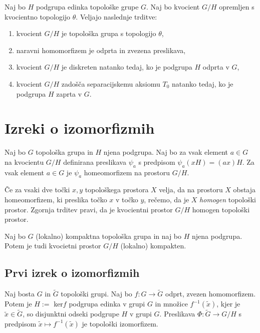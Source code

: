 \documentclass[mat1]{fmfdelo}
\begin{document}
\begin{izrek}\label{izr:kvocpovzetek}
Naj bo $H$ podgrupa edinka topološke grupe $G$. Naj bo kvocient $G/H$ opremljen s kvocientno topologijo $\theta$. Veljajo naslednje trditve:
\begin{enumerate}
\item kvocient $G/H$ je topološka grupa s topologijo $\theta$,
\item naravni homomorfizem je odprta in zvezena preslikava,
\item kvocient $G/H$ je diskreten natanko tedaj, ko je podgrupa $H$ odprta v $G$,
\item kvocient $G/H$ zadošča separacijskemu aksiomu $T_0$ natanko tedaj, ko je podgrupa $H$ zaprta v $G$.
\end{enumerate}
\end{izrek}

\section{Izreki o izomorfizmih}

\begin{trditev}\label{trd:homogenkvoc}
	Naj bo $G$ topološka grupa in $H$ njena podgrupa. Naj bo za vsak element $a \in G$ na kvocientu $G/H$ definirana preslikava $\psi_a$ s predpisom $\psi_a(xH) = (ax)H$.
	Za vsak element $a \in G$ je $\psi_a$ homeomorfizem na prostoru $G/H$.
\end{trditev}

\begin{opomba}\label{opo:homogenkvoc}
	Če za vsaki dve točki $x, y$ topološkega prostora $X$ velja, da na prostoru $X$ obstaja homeomorfizem, ki preslika točko $x$ v točko $y$, rečemo, da je $X$ \emph{homogen} topološki prostor. Zgornja trditev pravi, da je kvocientni prostor $G/H$ homogen topološki prostor.
\end{opomba}

\begin{trditev}\label{trd:kvockompakt}
	Naj bo $G$ (lokalno) kompaktna topološka grupa in naj bo $H$ njena podgrupa. Potem je tudi kvocietni prostor $G/H$ (lokalno) kompakten.
\end{trditev}

\subsection{Prvi izrek o izomorfizmih}
\begin{izrek}\label{izr:prvitopizrek}
Naj bosta $G$ in $\widetilde{G}$ topološki grupi. Naj bo $f: G \to \widetilde{G}$ odprt, zvezen homomorfizem. Potem je $H :=$ ker$f$ podgrupa edinka v grupi $G$ in množice $f^{-1}(\tilde{x})$, kjer je $\tilde{x} \in \widetilde{G}$, so disjunktni odseki podgrupe $H$ v grupi $G$. Preslikava $\Phi:\widetilde{G} \to G/H$ s predpisom $\tilde{x} \mapsto f^{-1}(\tilde{x})$ je topološki izomorfizem.
\end{izrek}
\end{document}
